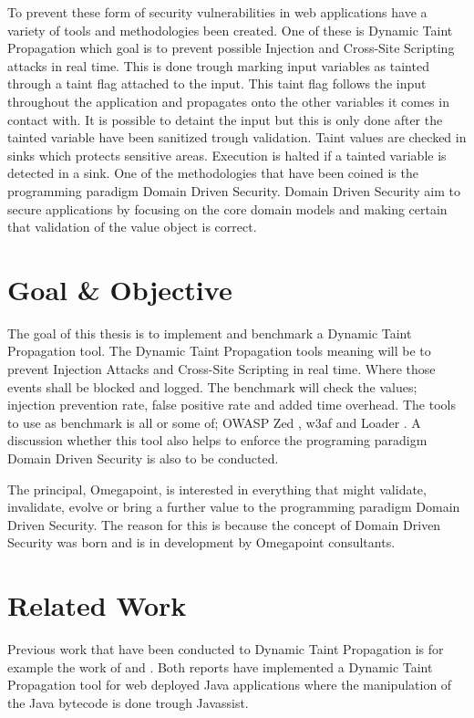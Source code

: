 \documentclass{../kththesis}
\begin{document}
To prevent these form of security vulnerabilities in web applications have a variety of tools and methodologies been created. One of these is Dynamic Taint Propagation which goal is to prevent possible Injection and Cross-Site Scripting attacks in real time. This is done trough marking input variables as tainted through a taint flag attached to the input. This taint flag follows the input throughout the application and propagates onto the other variables it comes in contact with. It is possible to detaint the input but this is only done after the tainted variable have been sanitized trough validation. Taint values are checked in sinks which protects sensitive areas. Execution is halted if a tainted variable is detected in a sink. \parencite{Pan2015, Venkataramani2008} One of the methodologies that have been coined is the programming paradigm Domain Driven Security. Domain Driven Security aim to secure applications by focusing on the core domain models and making certain that validation of the value object is correct. \parencite{Wilander2009, Johnsson2009}


\section{Goal \& Objective}
The goal of this thesis is to implement and benchmark a Dynamic Taint Propagation tool. The Dynamic Taint Propagation tools meaning will be to prevent Injection Attacks and Cross-Site Scripting in real time. Where those events shall be blocked and logged. The benchmark will check the values; injection prevention rate, false positive rate and added time overhead. The tools to use as benchmark is all or some of; OWASP Zed \parencite{zed}, w3af \parencite{w3af} and Loader \parencite{loader}. A discussion whether this tool also helps to enforce the programing paradigm Domain Driven Security is also to be conducted.

The principal, Omegapoint, is interested in everything that might validate, invalidate, evolve or bring a further value to the programming paradigm Domain Driven Security. The reason for this is because the concept of Domain Driven Security was born and is in development by Omegapoint consultants. 


\section{Related Work}
Previous work that have been conducted to Dynamic Taint Propagation is for example the work of \textcite{Haldar} and \textcite{Zhao2016}. Both reports have implemented a Dynamic Taint Propagation tool for web deployed Java applications where the manipulation of the Java bytecode is done trough Javassist.
\end{document}
